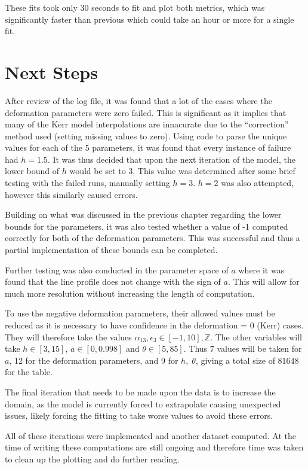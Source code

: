 \documentclass[
  letterpaper,
  DIV=11,
  numbers=noendperiod]{scrreprt}
\begin{document}
These fits took only 30 seconds to fit and plot both metrics, which was
significantly faster than previous which could take an hour or more for
a single fit.

\section{Next Steps}\label{next-steps}

After review of the log file, it was found that a lot of the cases where
the deformation parameters were zero failed. This is significant as it
implies that many of the Kerr model interpolations are innacurate due to
the ``correction'' method used (setting missing values to zero). Using
code to parse the unique values for each of the 5 parameters, it was
found that every instance of failure had \(h=1.5\). It was thus decided
that upon the next iteration of the model, the lower bound of \(h\)
would be set to 3. This value was determined after some brief testing
with the failed runs, manually setting \(h=3\). \(h=2\) was also
attempted, however this similarly caused errors.

Building on what was discussed in the previous chapter regarding the
lower bounds for the parameters, it was also tested whether a value of
-1 computed correctly for both of the deformation parameters. This was
successful and thus a partial implementation of these bounds can be
completed.

Further testing was also conducted in the parameter space of \(a\) where
it was found that the line profile does not change with the sign of
\(a\). This will allow for much more resolution without increasing the
length of computation.

To use the negative deformation parameters, their allowed values must be
reduced as it is necessary to have confidence in the deformation = 0
(Kerr) cases. They will therefore take the values
\(\alpha_{13}, \epsilon_3 \in [-1, 10], \mathbb{Z}\). The other
variables will take \(h\in[3,15]\), \(a\in[0,0.998]\) and
\(\theta\in [5,85]\). Thus 7 values will be taken for \(a\), 12 for the
deformation parameters, and 9 for \(h,\;\theta\), giving a total size of
81648 for the table.

The final iteration that needs to be made upon the data is to increase
the domain, as the model is currently forced to extrapolate causing
unexpected issues, likely forcing the fitting to take worse values to
avoid these errors.

All of these iterations were implemented and another dataset computed.
At the time of writing these computations are still ongoing and
therefore time was taken to clean up the plotting and do further
reading.
\end{document}
